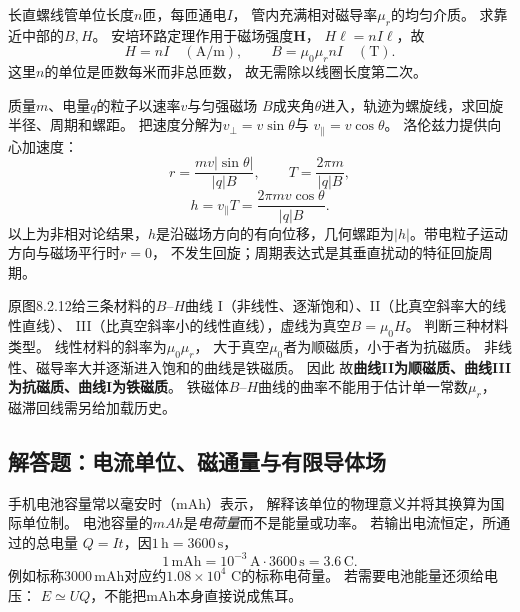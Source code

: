 \problemtext 长直螺线管单位长度$n$匝，每匝通电$I$，
管内充满相对磁导率$\mu_r$的均匀介质。
求靠近中部的$B,H$。
\workings
安培环路定理作用于磁场强度$\bm H$，
$H\ell=nI\ell$，故
\[
\boxed{H=nI\quad(\mathrm{A/m})},\qquad
\boxed{B=\mu_0\mu_r nI\quad(\mathrm T)}.
\]
\crosscheck 这里$n$的单位是匝数每米而非总匝数，
故无需除以线圈长度第二次。

\problemtext 质量$m$、电量$q$的粒子以速率$v$与匀强磁场
$B$成夹角$\theta$进入，轨迹为螺旋线，求回旋半径、周期和螺距。
\workings
把速度分解为$v_\perp=v\sin\theta$与
$v_\parallel=v\cos\theta$。
洛伦兹力提供向心加速度：
\[
\boxed{r=\frac{mv|\sin\theta|}{|q|B}},\qquad
\boxed{T=\frac{2\pi m}{|q|B}},
\]
\[
\boxed{h=v_\parallel T=
\frac{2\pi mv\cos\theta}{|q|B}}.
\]
\crosscheck 以上为非相对论结果，$h$是沿磁场方向的有向位移，几何螺距为$|h|$。带电粒子运动方向与磁场平行时$r=0$，
不发生回旋；周期表达式是其垂直扰动的特征回旋周期。

\problemtext 原图8.2.12给三条材料的$B$--$H$曲线
I（非线性、逐渐饱和）、II（比真空斜率大的线性直线）、
III（比真空斜率小的线性直线），虚线为真空$B=\mu_0H$。
判断三种材料类型。
\workings
线性材料的斜率为$\mu_0\mu_r$，
大于真空$\mu_0$者为顺磁质，小于者为抗磁质。
非线性、磁导率大并逐渐进入饱和的曲线是铁磁质。
因此
故\textbf{曲线II为顺磁质、曲线III为抗磁质、曲线I为铁磁质}。
\crosscheck 铁磁体$B$--$H$曲线的曲率不能用于估计单一常数$\mu_r$，
磁滞回线需另给加载历史。


\subsection{解答题：电流单位、磁通量与有限导体场}

\problemtext 手机电池容量常以毫安时（mAh）表示，
解释该单位的物理意义并将其换算为国际单位制。
\workings
电池容量的$mAh$是\emph{电荷量}而不是能量或功率。
若输出电流恒定，所通过的总电量
$Q=It$，因$1\,\mathrm{h}=3600\,\mathrm s$，
\[
\boxed{1\,\mathrm{mAh}=10^{-3}\,\mathrm A\cdot3600\,\mathrm s
=3.6\,\mathrm C}.
\]
例如标称$3000\,\mathrm{mAh}$对应约$1.08\times10^4$ C的标称电荷量。
\crosscheck 若需要电池能量还须给电压：
$E\simeq UQ$，不能把mAh本身直接说成焦耳。

